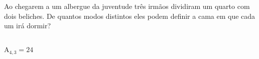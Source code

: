 \begin{ex}
Ao chegarem a um albergue da juventude três irmãos dividiram um quarto com dois beliches. De quantos modos distintos eles podem definir a cama em que cada um irá dormir?
  \begin{sol}
  \phantom{A}\\
  $\mathrm{A}_{4,3}=24$
  \end{sol}
\end{ex}